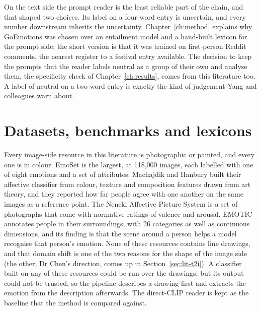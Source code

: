 On the text side the prompt reader is the least reliable part of the chain, and that shaped two choices. Its label on a four-word entry is uncertain, and every number downstream inherits the uncertainty. Chapter~\ref{ch:method} explains why GoEmotions was chosen over an entailment model and a hand-built lexicon for the prompt side; the short version is that it was trained on first-person Reddit comments, the nearest register to a festival entry available. The decision to keep the prompts that the reader labels neutral as a group of their own and analyse them, the specificity check of Chapter~\ref{ch:results}, comes from this literature too. A label of neutral on a two-word entry is exactly the kind of judgement Yang and colleagues warn about.

\section{Datasets, benchmarks and lexicons}
\label{sec:lit-data}

Every image-side resource in this literature is photographic or painted, and every one is in colour. EmoSet \cite{yang2023emoset} is the largest, at 118,000 images, each labelled with one of eight emotions and a set of attributes. Machajdik and Hanbury \cite{machajdik2010affective} built their affective classifier from colour, texture and composition features drawn from art theory, and they reported how far people agree with one another on the same images as a reference point. The Nencki Affective Picture System \cite{marchewka2014nencki} is a set of photographs that come with normative ratings of valence and arousal. EMOTIC \cite{kosti2020context} annotates people in their surroundings, with 26 categories as well as continuous dimensions, and its finding is that the scene around a person helps a model recognise that person's emotion. None of these resources contains line drawings, and that domain shift is one of the two reasons for the shape of the image side (the other, Dr Chen's direction, comes up in Section~\ref{sec:lit-t2i}). A classifier built on any of these resources could be run over the drawings, but its output could not be trusted, so the pipeline describes a drawing first and extracts the emotion from the description afterwards. The direct-CLIP reader is kept as the baseline that the method is compared against.

